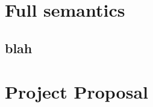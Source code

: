 \documentclass[12pt,twoside,notitlepage]{report}
\begin{document}
\appendix

\chapter{Full semantics}
\label{chap:fullsemantics}


\section{blah}









\cleardoublepage

\chapter{Project Proposal}


\end{document}
